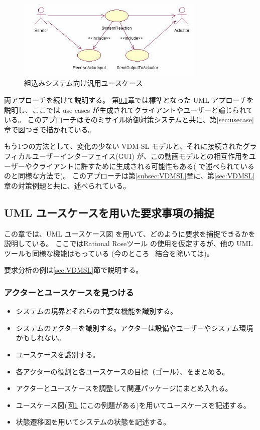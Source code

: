 \documentclass[\pformat,12pt]{jreport}
\begin{document}
\begin{figure}
\begin{center}
\includegraphics[width=0.8\textwidth]{generalusecase}
\end{center}
\caption{組込みシステム向け汎用ユースケース}\label{fig:usecase}
\end{figure}

両アプローチを続けて説明する。
第\ref{subsec:capuse}章では標準となった UML \cite{UML20} アプローチを説明し、ここでは use-cases が生成されてクライアントやユーザーと論じられている。
このアプローチはそのミサイル防御対策システムと共に、第\ref{sec:usecase}章で図つきで描かれている。

もう1つの方法として、変化の少ない VDM-SL モデルと、それに接続されたグラフィカルユーザーインターフェイス(GUI) が、この動画モデルとの相互作用をユーザーやクライアントに許すために生成される可能性もある( \cite{CashPoint}で述べられているのと同様な方法で)。
このアプローチは第\ref{subsec:VDMSL}章に、第\ref{sec:VDMSL}章の対策例題と共に、述べられている。

\subsection{UML ユースケースを用いた要求事項の捕捉}\label{subsec:capuse}

この章では、UML ユースケース図 \cite{UML20}を用いて、どのように要求を捕捉できるかを説明している。
ここではRational Roseツール \cite{Rose&00} の使用を仮定するが、他の UML ツールも同様な機能はもっている (今のところ \VDMTools\ 結合を除いては)。

要求分析の例は\ref{sec:VDMSL}節で説明する。

\subsubsection{アクターとユースケースを見つける}

\begin{itemize}
\item システムの境界とそれらの主要な機能を識別する。
\item システムのアクターを識別する。アクターは設備やユーザーやシステム環境かもしれない。
\item ユースケースを識別する。
\item 各アクターの役割と各ユースケースの目標（ゴール）、をまとめる。
\item アクターとユースケースを調整して関連パッケージにまとめ入れる。
\item ユースケース図(図\ref{fig:usecase} にこの例題がある)を用いてユースケースを記述する。
\item 状態遷移図を用いてシステムの状態を記述する。
\end{itemize}
\end{document}
